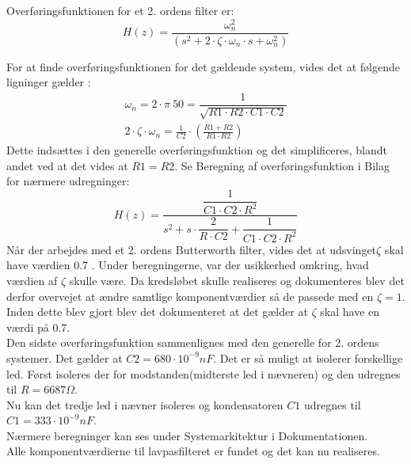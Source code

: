 Overføringsfunktionen for et 2. ordens filter er: 
\begin{equation}
H(z)=\frac{\omega_n^2}{(s^2 + 2\cdot\zeta \cdot \omega_n \cdot s+\omega_n^2)}
\end{equation}

For at finde overføringsfunktionen for det gældende system, vides det at følgende ligninger gælder \cite{Wikilavpas}: 
\begin{equation}
\begin{split}
\omega_n = 2\cdot \pi\ 50 = \dfrac{1}{\sqrt{R1\cdot R2\cdot C1\cdot C2}}\\
2\cdot \zeta\cdot\omega_n =\frac{1}{C2}\cdot \left( \frac{R1+R2}{R1\cdot R2}\right)
\end{split}
\end{equation}
Dette indsættes i den generelle overføringsfunktion og det simplificeres, blandt andet ved at det vides at $ R1=R2 $. 
Se Beregning af overføringsfunktion i Bilag for nærmere udregninger: 
\begin{equation}
H(z)=\dfrac{\dfrac{1}{C1 \cdot C2\cdot R^2}}{s^2+s\cdot \dfrac{2}{R\cdot C2}+ \dfrac{1}{C1\cdot C2\cdot R^2}}
\end{equation}
Når der arbejdes med et 2. ordens Butterworth filter, vides det at udsvinget$ \zeta $ skal have værdien 0.7 \cite{ASB}.
Under beregningerne, var der usikkerhed omkring, hvad værdien af $ \zeta $ skulle være. Da kredsløbet skulle realiseres og dokumenteres blev det derfor overvejet at ændre samtlige komponentværdier så de passede med en $ \zeta = 1 $. Inden dette blev gjort blev det dokumenteret at det gælder at $ \zeta $ skal have en værdi på 0.7. \\
  
Den sidste overføringsfunktion sammenlignes med den generelle for 2. ordens systemer. Det gælder at $ C2 = 680\cdot 10^{-9} nF $. Det er så muligt at isolerer forskellige led. Først isoleres der for modstanden(midterste led i nævneren) og den udregnes til $ R = 6687\Omega $. \\
Nu kan det tredje led i nævner isoleres og kondensatoren $ C1 $ udregnes til $ C1 = 333 \cdot 10^{-9} nF $. \\
Nærmere beregninger kan ses under Systemarkitektur i Dokumentationen. \\
Alle komponentværdierne til lavpasfilteret er fundet og det kan nu realiseres. \\ 

